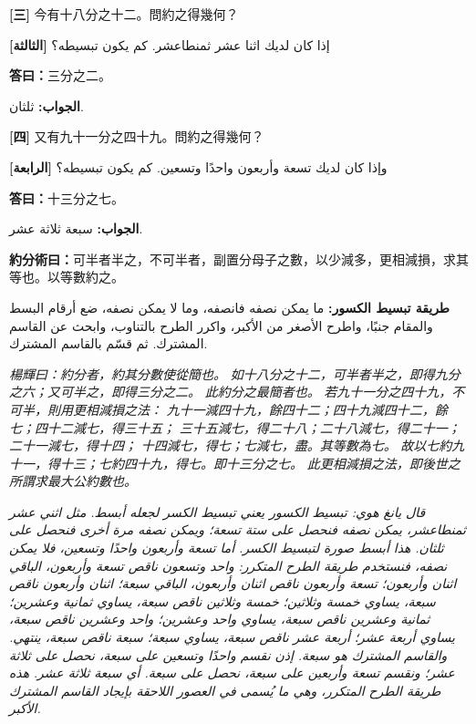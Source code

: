 \documentclass[11pt,a4paper]{article}
\newcommand{\bilingualrow}[2]{%
\noindent\begin{minipage}[t]{0.48\textwidth}#1\end{minipage}\hfill\begin{minipage}[t]{0.48\textwidth}\arabicfont\beginR #2\endR\end{minipage}\par\vspace{0.5cm}}
\begin{document}
\bilingualrow{
\textbf{[三]} 今有十八分之十二。問約之得幾何？
}{
\textbf{[الثالثة]} إذا كان لديك اثنا عشر ثمنطاعشر. كم يكون تبسيطه؟
}

\bilingualrow{
\textcolor{answercolor}{\textbf{答曰：}}三分之二。
}{
\textcolor{answercolor}{\textbf{الجواب:}} ثلثان.
}

\bilingualrow{
\textbf{[四]} 又有九十一分之四十九。問約之得幾何？
}{
\textbf{[الرابعة]} وإذا كان لديك تسعة وأربعون واحدًا وتسعين. كم يكون تبسيطه؟
}

\bilingualrow{
\textcolor{answercolor}{\textbf{答曰：}}十三分之七。
}{
\textcolor{answercolor}{\textbf{الجواب:}} سبعة ثلاثة عشر.
}

\vspace{0.5em}

\bilingualrow{
\textcolor{methodcolor}{\textbf{約分術曰：}}可半者半之，不可半者，副置分母子之數，以少減多，更相減損，求其等也。以等數約之。
}{
\textcolor{methodcolor}{\textbf{طريقة تبسيط الكسور:}} ما يمكن نصفه فانصفه، وما لا يمكن نصفه، ضع أرقام البسط والمقام جنبًا، واطرح الأصغر من الأكبر، واكرر الطرح بالتناوب، وابحث عن القاسم المشترك. ثم قسّم بالقاسم المشترك.
}

\bilingualrow{
\textcolor{commentarycolor}{\small\textit{楊輝曰：約分者，約其分數使從簡也。}}
\textcolor{commentarycolor}{\small\textit{如十八分之十二，可半者半之，即得九分之六；又可半之，即得三分之二。}}
\textcolor{commentarycolor}{\small\textit{此約分之最簡者也。}}
\textcolor{commentarycolor}{\small\textit{若九十一分之四十九，不可半，則用更相減損之法：}}
\textcolor{commentarycolor}{\small\textit{九十一減四十九，餘四十二；四十九減四十二，餘七；四十二減七，得三十五；}}
\textcolor{commentarycolor}{\small\textit{三十五減七，得二十八；二十八減七，得二十一；二十一減七，得十四；}}
\textcolor{commentarycolor}{\small\textit{十四減七，得七；七減七，盡。其等數為七。}}
\textcolor{commentarycolor}{\small\textit{故以七約九十一，得十三；七約四十九，得七。即十三分之七。}}
\textcolor{commentarycolor}{\small\textit{此更相減損之法，即後世之所謂求最大公約數也。}}
}{
\textcolor{commentarycolor}{\small\textit{قال يانغ هوي: تبسيط الكسور يعني تبسيط الكسر لجعله أبسط.}}
\textcolor{commentarycolor}{\small\textit{مثل اثني عشر ثمنطاعشر، يمكن نصفه فنحصل على ستة تسعة؛ ويمكن نصفه مرة أخرى فنحصل على ثلثان.}}
\textcolor{commentarycolor}{\small\textit{هذا أبسط صورة لتبسيط الكسر.}}
\textcolor{commentarycolor}{\small\textit{أما تسعة وأربعون واحدًا وتسعين، فلا يمكن نصفه، فنستخدم طريقة الطرح المتكرر:}}
\textcolor{commentarycolor}{\small\textit{واحد وتسعون ناقص تسعة وأربعون، الباقي اثنان وأربعون؛ تسعة وأربعون ناقص اثنان وأربعون، الباقي سبعة؛ اثنان وأربعون ناقص سبعة، يساوي خمسة وثلاثين؛}}
\textcolor{commentarycolor}{\small\textit{خمسة وثلاثين ناقص سبعة، يساوي ثمانية وعشرين؛ ثمانية وعشرين ناقص سبعة، يساوي واحد وعشرين؛ واحد وعشرين ناقص سبعة، يساوي أربعة عشر؛}}
\textcolor{commentarycolor}{\small\textit{أربعة عشر ناقص سبعة، يساوي سبعة؛ سبعة ناقص سبعة، ينتهي. والقاسم المشترك هو سبعة.}}
\textcolor{commentarycolor}{\small\textit{إذن نقسم واحدًا وتسعين على سبعة، نحصل على ثلاثة عشر؛ ونقسم تسعة وأربعين على سبعة، نحصل على سبعة. أي سبعة ثلاثة عشر.}}
\textcolor{commentarycolor}{\small\textit{هذه طريقة الطرح المتكرر، وهي ما يُسمى في العصور اللاحقة بإيجاد القاسم المشترك الأكبر.}}
}
\end{document}
